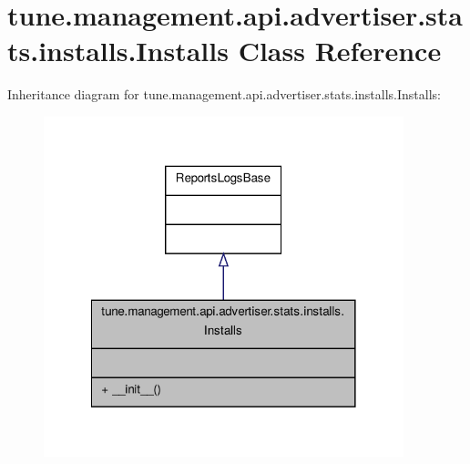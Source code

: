 \hypertarget{classtune_1_1management_1_1api_1_1advertiser_1_1stats_1_1installs_1_1Installs}{\section{tune.\-management.\-api.\-advertiser.\-stats.\-installs.\-Installs Class Reference}
\label{classtune_1_1management_1_1api_1_1advertiser_1_1stats_1_1installs_1_1Installs}
}


Inheritance diagram for tune.\-management.\-api.\-advertiser.\-stats.\-installs.\-Installs\-:
\nopagebreak
\begin{figure}[H]
\begin{center}
\leavevmode
\includegraphics[width=296pt]{classtune_1_1management_1_1api_1_1advertiser_1_1stats_1_1installs_1_1Installs__inherit__graph}
\end{center}
\end{figure}


